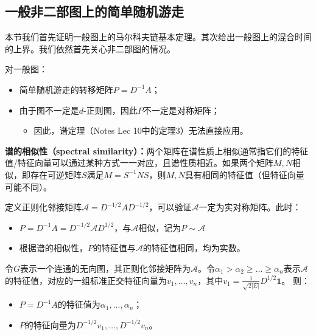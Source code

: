 \documentclass[lang=cn,newtx,10pt,scheme=chinese,chinesefont=nofont,citestyle=gb7714-2015, bibstyle=gb7714-2015]{elegantbook}
\begin{document}
\begin{refsection}
            


\subsection{一般非二部图上的简单随机游走}

本节我们首先证明一般图上的马尔科夫链基本定理。其次给出一般图上的混合时间的上界。我们依然首先关心非二部图的情况。

\vspace{0.2cm}
对一般图：
\begin{itemize}
    \item 简单随机游走的转移矩阵$P=D^{-1}A$；
    \item 由于图不一定是$d$-正则图，因此$P$不一定是对称矩阵；
    \begin{itemize}
        \item 因此，谱定理（Notes Lec 10中的定理3）无法直接应用。
    \end{itemize}
\end{itemize}

\vspace{0.2cm}
\textbf{谱的相似性（spectral similarity）：}两个矩阵在谱性质上相似通常指它们的特征值/特征向量可以通过某种方式一一对应，且谱性质相近。如果两个矩阵$M,N$相似，即存在可逆矩阵$S$满足$M=S^{-1}NS$，则$M,N$具有相同的特征值（但特征向量可能不同）。
            
\vspace{0.2cm}
定义正则化邻接矩阵$\mathcal{A}=D^{-1/2}AD^{-1/2}$，可以验证$\mathcal{A}$一定为实对称矩阵。此时：
\begin{itemize}
    \item $P=D^{-1}A=D^{-1/2}\mathcal{A}D^{1/2}$，与$\mathcal{A}$相似，记为$P\sim \mathcal{A}$
    \item 根据谱的相似性，$P$的特征值与$\mathcal{A}$的特征值相同，均为实数。
\end{itemize}

\begin{lemma}
    \label{lemma:s-s}
    令$G$表示一个连通的无向图，其正则化邻接矩阵为$\mathcal{A}$。令$\alpha_1>\alpha_2\ge \dots\ge \alpha_n$表示$\mathcal{A}$的特征值，对应的一组标准正交特征向量为$v_1,\dots,v_n$，其中$v_1=\frac{1}{\sqrt{2|E|}}D^{1/2}\bm{1}$。
    则：
    \begin{itemize}
        \item $P=D^{-1}A$的特征值为$\alpha_1,\dots,\alpha_n$；
        \item $P$的特征向量为$D^{-1/2}v_1,\dots,D^{-1/2}v_n$。
    \end{itemize}
\end{lemma}


\end{refsection}
\end{document}
